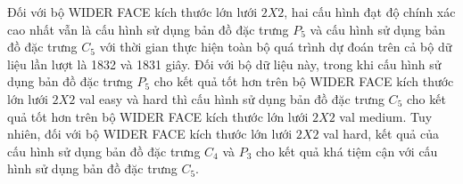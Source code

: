 {    \noindent
    Đối với bộ WIDER FACE kích thước lớn lưới $2 X 2$, hai cấu hình đạt độ chính xác cao nhất vẫn là cấu hình sử dụng bản đồ đặc trưng ${P}_{5}$ và cấu hình sử dụng bản đồ đặc trưng ${C}_{5}$ với thời gian thực hiện toàn bộ quá trình dự đoán trên cả bộ dữ liệu lần lượt là 1832 và 1831 giây.
    Đối với bộ dữ liệu này, trong khi cấu hình sử dụng bản đồ đặc trưng ${P}_{5}$ cho kết quả tốt hơn trên bộ WIDER FACE kích thước lớn lưới $2 X 2$ val easy và hard thì cấu hình sử dụng bản đồ đặc trưng ${C}_{5}$ cho kết quả tốt hơn trên bộ WIDER FACE kích thước lớn lưới $2 X 2$ val medium.
    Tuy nhiên, đối với bộ WIDER FACE kích thước lớn lưới $2 X 2$ val hard, kết quả của cấu hình sử dụng bản đồ đặc trưng ${C}_{4}$ và ${P}_{3}$ cho kết quả khá tiệm cận với cấu hình sử dụng bản đồ đặc trưng ${C}_{5}$.

}
